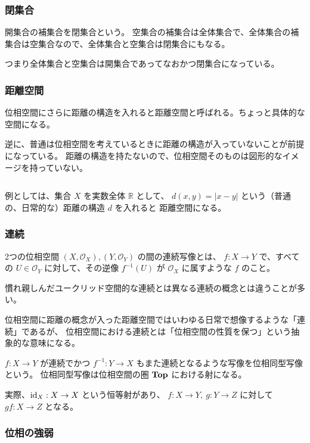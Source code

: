 \documentclass[uplatex,a4j,12pt,dvipdfmx]{jsarticle}
\begin{document}
\subsubsection{閉集合}

開集合の補集合を閉集合という。
空集合の補集合は全体集合で、全体集合の補集合は空集合なので、全体集合と空集合は閉集合にもなる。

つまり全体集合と空集合は開集合であってなおかつ閉集合になっている。


\subsubsection{距離空間}

位相空間にさらに距離の構造を入れると距離空間と呼ばれる。ちょっと具体的な空間になる。

逆に、普通は位相空間を考えているときに距離の構造が入っていないことが前提になっている。
距離の構造を持たないので、位相空間そのものは図形的なイメージを持っていない。

${}$

例としては、集合 $X$ を実数全体 $\mathbb{R}$ として、 $d(x,y) = |x-y|$ という（普通の、日常的な）距離の構造 $d$ を入れると
距離空間になる。

\subsubsection{連続}

2つの位相空間 $(X, {\mathcal O}_{X}), (Y, {\mathcal O}_{Y})$ の間の連続写像とは、
$f: X \to Y$ で、すべての $U \in {\mathcal O}_{Y}$ に対して、その逆像
$f^{-1}(U)$ が ${\mathcal O}_{X}$ に属すような $f$ のこと。

慣れ親しんだユークリッド空間的な連続とは異なる連続の概念とは違うことが多い。

位相空間に距離の概念が入った距離空間ではいわゆる日常で想像するような「連続」であるが、
位相空間における連続とは「位相空間の性質を保つ」という抽象的な意味になる。

$f: X \to Y$ が連続でかつ $f^{-1}: Y \to X$ もまた連続となるような写像を位相同型写像という。
位相同型写像は位相空間の圏 ${\bf Top}$ における射になる。

実際、${\rm id}_{X}: X \to X$ という恒等射があり、
$f: X \to Y, \ g: Y \to Z$ に対して $g f : X \to Z$ となる。


\subsubsection{位相の強弱}
\end{document}
